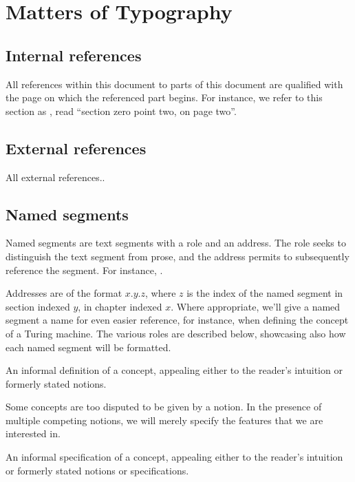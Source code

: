 \section{Matters of Typography}

\subsection{Internal references} \label{sec:introduction:internal-references}

All references within this document to parts of this document are qualified
with the page on which the referenced part begins. For instance, we refer to
this section as , read ``section
zero point two, on page two''.

\subsection{External references} \label{sec:introduction:external-references}

All external references..

\subsection{Named segments}

Named segments are text segments with a role and an address. The role seeks to
distinguish the text segment from prose, and the address permits to
subsequently reference the segment. For instance, .

Addresses are of the format \mbox{$x$.$y$.$z$}, where $z$ is the index of the
named segment in section indexed $y$, in chapter indexed $x$. Where
appropriate, we'll give a named segment a name for even easier reference, for
instance, when defining the concept of a Turing machine. The various roles are
described below, showcasing also how each named segment will be formatted.

\begin{notion} An informal definition of a concept, appealing either to the
reader's intuition or formerly stated notions. \end{notion}

Some concepts are too disputed to be given by a notion. In the presence of
multiple competing notions, we will merely specify the features that we are
interested in.

\begin{specification} An informal specification of a concept, appealing either
to the reader's intuition or formerly stated notions or specifications.
\end{specification}

